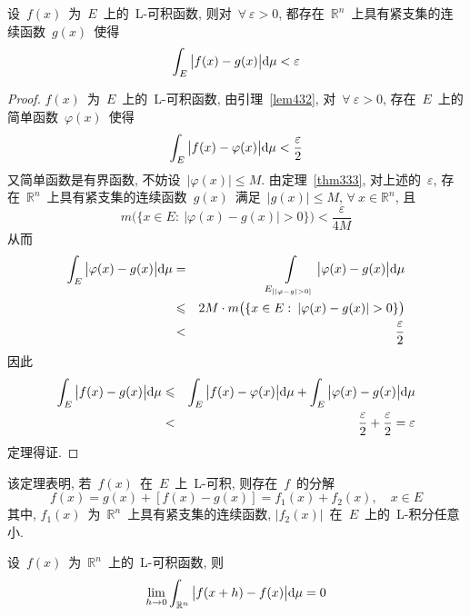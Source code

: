 \begin{theorem}
设~$f(x)$~为~$E$~上的~L-可积函数, 则对~$\forall~ \varepsilon > 0$,  都存在~$\mathbb{R}^n$~上具有紧支集的连续函数~$g(x)$~使得
\[
\int_E \big|f(x) - g(x) \big| \mathrm{d} \mu < \varepsilon
\]
\end{theorem}

\begin{proof}
$f(x)$~为~$E$~上的~L-可积函数, 由引理~\ref{lem432}, 对~$\forall~ \varepsilon > 0$,  存在~$E$~上的简单函数~$\varphi(x)$~使得
\[
\int_E \big|f(x) - \varphi(x) \big| \mathrm{d} \mu < \frac{\varepsilon}{2}
\]
又简单函数是有界函数, 不妨设~$|\varphi(x)| \leqslant M$. 由定理~\ref{thm333}, 对上述的~$\varepsilon$,  存在~$\mathbb{R}^n$~上具有紧支集的连续函数~$g(x)$~满足~$|g(x)| \leqslant M,  \,  \forall~x \in \mathbb{R}^n$, 且
\[
m\big( \{x \in E: \: |\varphi(x) - g(x)| > 0\} \big) < \frac{\varepsilon}{4M}
\]
从而
\begin{eqnarray*}
\int_E \big|\varphi(x) - g(x)\big| \d \mu &=& \int\limits_{E_{[|\varphi - g|> 0]}} \big|\varphi(x) - g(x)\big| \d \mu \\
&\leqslant& 2 M \cdot m\big( \{x \in E: \: |\varphi(x) - g(x)| > 0\} \big) \\
&<& \frac{\varepsilon}{2}
\end{eqnarray*}
因此
\begin{eqnarray*}
\int_E \big|f(x) - g(x)\big| \mathrm{d} \mu &\leqslant& \int_E \big|f(x) - \varphi(x)\big| \mathrm{d} \mu + \int_E \big|\varphi(x) - g(x)\big| \mathrm{d} \mu \\
&<& \frac{\varepsilon}{2} + \frac{\varepsilon}{2} = \varepsilon
\end{eqnarray*}
定理得证.
\end{proof}

\begin{remark}
该定理表明, 若~$f(x)$~在~$E$~上~L-可积, 则存在~$f$~的分解
\[
f(x) = g(x) + [f(x) - g(x)] = f_1(x) + f_2(x),  \quad x \in E
\]
其中, $f_1(x)$~为~$\mathbb{R}^n$~上具有紧支集的连续函数, $|f_2(x)|$~在~$E$~上的~L-积分任意小.
\end{remark}

\begin{theorem}
设~$f(x)$~为~$\mathbb{R}^n$~上的~L-可积函数, 则
\[
\lim_{h \to 0} \int_{\mathbb{R}^n} \big| f(x + h) - f(x) \big| \mathrm{d} \mu = 0
\]
\end{theorem}

